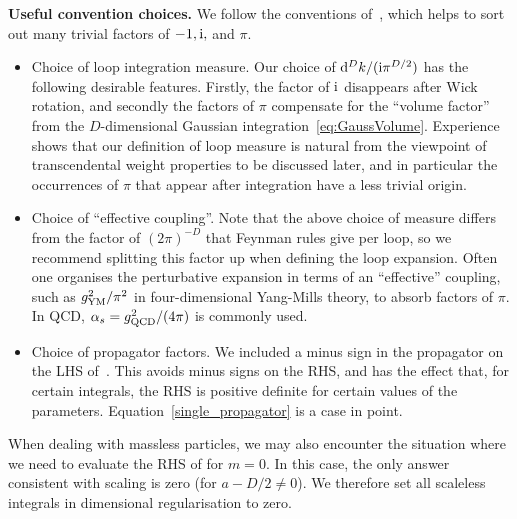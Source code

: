 \begin{svgraybox}
{\bf Useful convention choices.} 
We follow the conventions of~\cite{ch4Smirnov:2012gma}, which helps to sort out many trivial factors of $-1, \mathrm{i},$ and $\pi$.
\begin{itemize}
\item Choice of loop integration measure. Our choice of ${\mathrm{d}^{D}k}/({\mathrm{i} \pi^{D/2}})$ has the following desirable features. Firstly,
 the factor of $\mathrm{i}$ disappears after Wick rotation, and secondly the factors of $\pi$ compensate for the ``volume factor'' from the $D$-dimensional Gaussian integration~\eqref{eq:GaussVolume}. 
Experience shows that our definition of loop measure is natural from the viewpoint of transcendental weight properties to be discussed later, and in particular the occurrences of $\pi$ that appear after integration have a less trivial origin. 

\item Choice of ``effective coupling''. Note that the above choice of measure differs from the factor of $(2 \pi)^{-D}$ that Feynman rules give per loop, so we recommend splitting this factor up when defining the loop expansion. Often one organises the perturbative expansion in terms of an ``effective'' coupling, such as $g_{\rm YM}^2/\pi^2$ in four-dimensional Yang-Mills theory, to absorb factors of $\pi$. In QCD, $\alpha_s = g_{\rm QCD}^2/(4 \pi)$ is commonly used.

\item Choice of propagator factors. We included a minus sign in the propagator on the LHS of~. This avoids minus signs on the RHS, and has the effect that, for certain integrals, the RHS is positive definite for certain values of the parameters.  Equation~\eqref{single_propagator} is a case in point. 
\end{itemize}
\end{svgraybox}


When dealing with massless particles, we may also encounter the situation where we need to evaluate the RHS of  for $m=0$. In this case, the only answer consistent with scaling is zero (for $a -D/2\neq 0$). We therefore set all scaleless integrals in dimensional regularisation to zero. 


